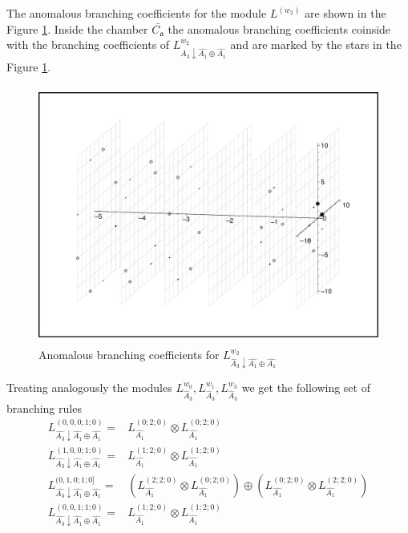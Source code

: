 \documentclass[a4paper,12pt]{article}
\theoremstyle{definition} \newtheorem{Def}{Definition}
\begin{document}
The anomalous branching coefficients for the module $L^{(w_2)}$ are shown in the Figure  \ref{fig:A1+A1-A3_branching}.
Inside the chamber $\bar{C_{\mathfrak{a}}}$ the anomalous branching coefficients coinside with
the branching coefficients of $L^{w_2}_{\hat A_3\downarrow \hat{A_1}\oplus\hat{A_1}}$
and are marked by the stars in the Figure \ref{fig:A1+A1-A3_branching}.
\begin{figure}[h!tb]
  \includegraphics[width=135mm,height=85mm]{A1+A1-A3_branching.pdf}
  \caption{Anomalous branching coefficients for $L^{w_2}_{\hat A_3\downarrow \hat{A_1}\oplus\hat{A_1}}$}
  \label{fig:A1+A1-A3_branching}
\end{figure}

Treating analogously the modules $L^{w_0}_{\hat A_3}, L^{w_1}_{\hat A_3}, L^{w_3}_{\hat A_3}$
we get the following set of branching rules
 \begin{equation}
   \label{eq:39}
   \begin{array}{ll}
     L^{(0,0,0;1;0)}_{\hat{A_3}\downarrow \hat{A_1}\oplus \hat{A_1}}= & L_{\hat{A_1}}^{(0;2;0)}\otimes L_{\hat{A_1}}^{(0;2;0)} \\
     L^{(1,0,0;1;0)}_{\hat{A_3}\downarrow \hat{A_1}\oplus \hat{A_1}}= & L_{\hat{A_1}}^{(1;2;0)}\otimes L_{\hat{A_1}}^{(1;2;0)} \\
     L^{(0,1,0;1;0]}_{\hat{A_3}\downarrow \hat{A_1}\oplus \hat{A_1}}= & \left( L_{\hat{A_1}}^{(2;2;0)}\otimes L_{\hat{A_1}}^{(0;2;0)}\right) \oplus \left( L_{\hat{A_1}}^{(0;2;0)}\otimes L_{\hat{A_1}}^{(2;2;0)}\right) \\
     L^{(0,0,1;1;0)}_{\hat{A_3}\downarrow \hat{A_1}\oplus \hat{A_1}}= & L_{\hat{A_1}}^{(1;2;0)}\otimes L_{\hat{A_1}}^{(1;2;0)} \\     
   \end{array}
 \end{equation}
\end{document}
